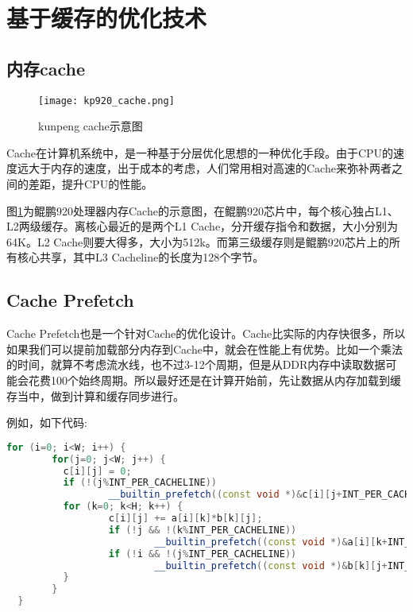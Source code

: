 \section{基于缓存的优化技术}

\subsection{内存cache}

\begin{figure}[htbp]
    \centering
    \texttt{[image: kp920\_cache.png]}
    \caption{kunpeng cache示意图}
    \label{Kunpeng Cache示意图}
\end{figure}


Cache在计算机系统中，是一种基于分层优化思想的一种优化手段。由于CPU的速度远大于内存的速度，出于成本的考虑，人们常用相对高速的Cache来弥补两者之间的差距，提升CPU的性能。

图\ref{Kunpeng Cache示意图}为鲲鹏920处理器内存Cache的示意图\cite{kunpeng920pub}，在鲲鹏920芯片中，每个核心独占L1、L2两级缓存。离核心最近的是两个L1 Cache，分开缓存指令和数据，大小分别为64K。L2 Cache则要大得多，大小为512k。而第三级缓存则是鲲鹏920芯片上的所有核心共享，其中L3 Cacheline的长度为128个字节。

\subsection{Cache Prefetch}
Cache Prefetch也是一个针对Cache的优化设计。Cache比实际的内存快很多，所以如果我们可以提前加载部分内存到Cache中，就会在性能上有优势。比如一个乘法的时间，就算不考虑流水线，也不过3-12个周期，但是从DDR内存中读取数据可能会花费100个始终周期。所以最好还是在计算开始前，先让数据从内存加载到缓存当中，做到计算和缓存同步进行。

例如，如下代码:
\begin{lstlisting}[language=c++]
    for (i=0; i<W; i++) {
        for(j=0; j<W; j++) {
          c[i][j] = 0;
          if (!(j%INT_PER_CACHELINE))
                  __builtin_prefetch((const void *)&c[i][j+INT_PER_CACHELINE], 1, 3);
          for (k=0; k<H; k++) {
                  c[i][j] += a[i][k]*b[k][j];
                  if (!j && !(k%INT_PER_CACHELINE))
                          __builtin_prefetch((const void *)&a[i][k+INT_PER_CACHELINE], 0, 3);
                  if (!i && !(j%INT_PER_CACHELINE))
                          __builtin_prefetch((const void *)&b[k][j+INT_PER_CACHELINE], 0, 3);
          }
        }
  }
\end{lstlisting}

